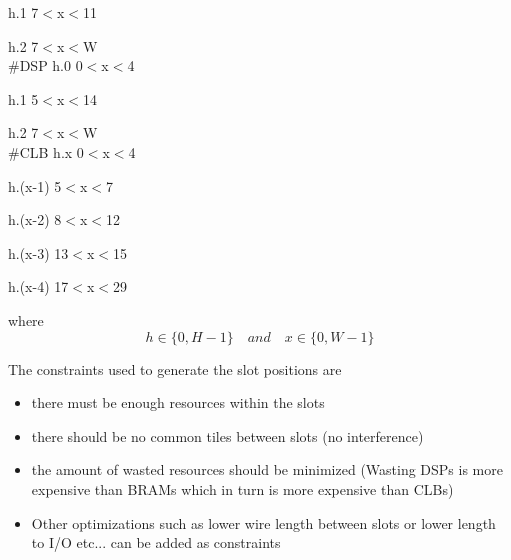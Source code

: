 \documentclass[11pt]{article}
\theoremstyle{definition}
\begin{document}
   					  \hspace{48mm} h.1 \hspace{10mm} 7$<$x$<$11
   					  
   					  \hspace{48mm} h.2 \hspace{10mm} 7$<$x$<$W  \\

\hspace{15mm} \#DSP  \hspace{20mm} h.0 \hspace{10mm}  0$<$x$<$4

					  \hspace{49mm} h.1 \hspace{10mm}  5$<$x$<$14
					  
					  \hspace{49mm} h.2 \hspace{10mm} 7$<$x$<$W   \\

\hspace{15mm} \#CLB  \hspace{20mm} h.x \hspace{15mm}  0$<$x$<$4
					  				  
					  \hspace{48mm} h.(x-1) \hspace{10mm} 5$<$x$<$7
					  
					  \hspace{48mm} h.(x-2) \hspace{10mm} 8$<$x$<$12
					  
					  \hspace{48mm} h.(x-3) \hspace{10mm} 13$<$x$<$15
					  
					  \hspace{48mm} h.(x-4) \hspace{10mm} 17$<$x$<$29

\hspace{15mm} where \[h\in \{0, H-1 \}  \quad and \quad x\in \{0, W-1 \} \]

The constraints used to generate the slot positions are
\begin{itemize}
\item there must be enough resources within the slots
\item there should be no common tiles between slots (no interference)
\item the amount of wasted resources should be minimized (Wasting DSPs is more expensive than BRAMs which in turn is more expensive than CLBs)
\item Other optimizations such as lower wire length between slots or lower length to I/O etc... can be added as constraints
\end{itemize}
\end{document}
